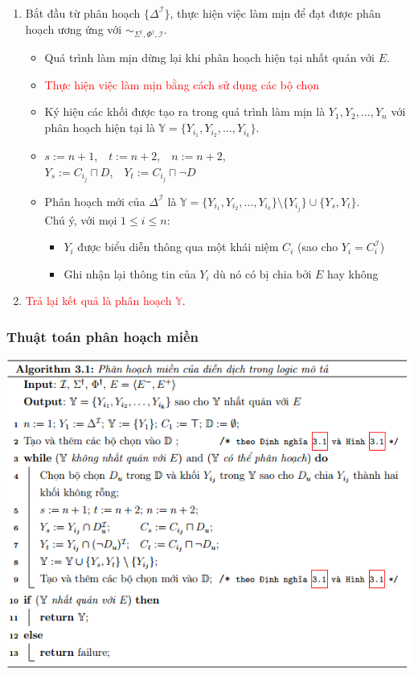\documentclass[notheorems,xcolor=dvipsnames]{beamer}
\newcommand{\mI}		{\mathcal{I}}
\newcommand{\mbY}		{\mathbb{Y}}
\newcommand{\SigmaDag}	{\Sigma^\dag}
\newcommand{\SdPdI}		{{\SigmaDag,\Phi^\dag,\mI}}
\newcommand{\mand}		{\sqcap}
\begin{document}
\begin{frame}\frametitle{}
	\begin{enumerate}
		\setlength{\itemsep}{2.5ex}
		\item Bắt đầu từ phân hoạch $\{\Delta^\mI\}$, thực hiện việc làm mịn để đạt được phân hoạch ương ứng với $\sim_\SdPdI$.
		\begin{itemize}
			\setlength{\itemsep}{1.5ex}
			\item Quá trình làm mịn dừng lại khi phân hoạch hiện tại nhất quán với $E$.
			\item \textcolor{red}{Thực hiện việc làm mịn bằng cách sử dụng các bộ chọn}
			\item Ký hiệu các khối được tạo ra trong quá trình làm mịn là $Y_1,Y_2,…,Y_n$ với phân hoạch hiện tại là $\mbY = \{Y_{i_1}, Y_{i_2},\ldots, Y_{i_k}\}$.
			\item $s := n+1$,\ \ $t := n+2$,\ \ $n := n+2$,\\ $Y_s := C_{i_j} \mand D$,\ \ $Y_t := C_{i_j} \mand \lnot D$
			\item Phân hoạch mới của $\Delta^\mI$ là $\mbY = \{Y_{i_1},Y_{i_2},\ldots,Y_{i_k}\} \setminus \{Y_{i_j}\} \cup \{Y_s,Y_t\}$.\\
			Chú ý, với mọi $1 \leq i \leq n$:
			\begin{itemize}
				\setlength{\itemsep}{1.5ex}
				\item $Y_i$ được biểu diễn thông qua một khái niệm $C_i$ (sao cho $Y_i = C_i^\mI$)
				\item Ghi nhận lại thông tin của $Y_i$ dù nó có bị chia bởi $E$ hay không				
			\end{itemize}
		\end{itemize}
		
		\item \textcolor{red}{Trả lại kết quả là phân hoạch $\mbY$}.
	\end{enumerate}
\end{frame}

\begin{frame}\frametitle{\bf Thuật toán phân hoạch miền}
	\includegraphics[scale=0.65]{ThuatToan1.png}
\end{frame}
\end{document}
